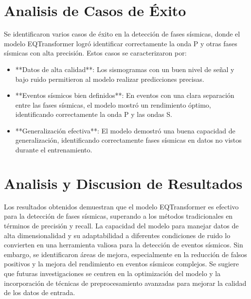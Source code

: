 \section{Analisis de Casos de Éxito}
Se identificaron varios casos de éxito en la detección de fases sísmicas, donde el modelo EQTransformer logró identificar correctamente la onda P y otras fases sísmicas con alta precisión. Estos casos se caracterizaron por:
\begin{itemize}
    \item **Datos de alta calidad**: Los sismogramas con un buen nivel de señal y bajo ruido permitieron al modelo realizar predicciones precisas.
    \item **Eventos sísmicos bien definidos**: En eventos con una clara separación entre las fases sísmicas, el modelo mostró un rendimiento óptimo, identificando correctamente la onda P y las ondas S.
    \item **Generalización efectiva**: El modelo demostró una buena capacidad de generalización, identificando correctamente fases sísmicas en datos no vistos durante el entrenamiento.
\end{itemize}

\section{Analisis y Discusion de Resultados}
Los resultados obtenidos demuestran que el modelo EQTransformer es efectivo para la detección de fases sísmicas, superando a los métodos tradicionales en términos de precisión y recall. La capacidad del modelo para manejar datos de alta dimensionalidad y su adaptabilidad a diferentes condiciones de ruido lo convierten en una herramienta valiosa para la detección de eventos sísmicos.
Sin embargo, se identificaron áreas de mejora, especialmente en la reducción de falsos positivos y la mejora del rendimiento en eventos sísmicos complejos. Se sugiere que futuras investigaciones se centren en la optimización del modelo y la incorporación de técnicas de preprocesamiento avanzadas para mejorar la calidad de los datos de entrada.
